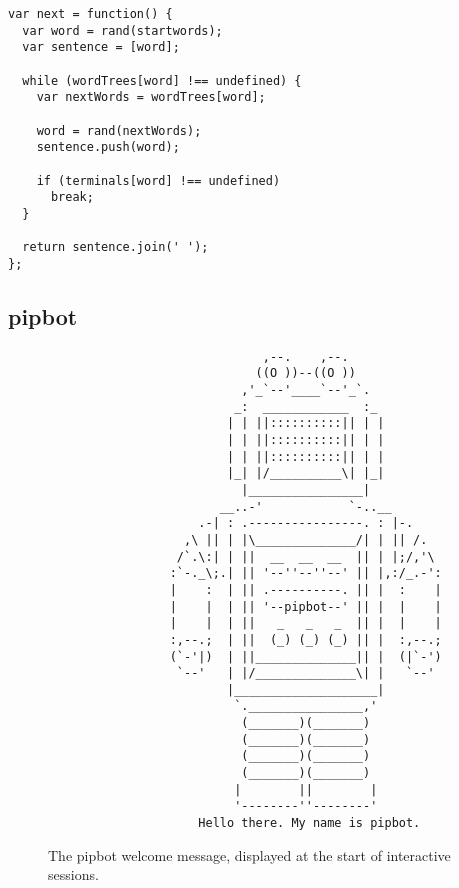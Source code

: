 \lstset{language=JavaScript}
\begin{lstlisting}[label=lst:build-javascript,caption={
      [Markov text generator]
      Markov text generator implementation.}]
var next = function() {
  var word = rand(startwords);
  var sentence = [word];

  while (wordTrees[word] !== undefined) {
    var nextWords = wordTrees[word];

    word = rand(nextWords);
    sentence.push(word);

    if (terminals[word] !== undefined)
      break;
  }

  return sentence.join(' ');
};
\end{lstlisting}


\newpage
\subsection{pipbot}\label{sec:pipbot}


\begin{figure}[H]
\begin{verbatim}
                              ,--.    ,--.
                             ((O ))--((O ))
                           ,'_`--'____`--'_`.
                          _:  ____________  :_
                         | | ||::::::::::|| | |
                         | | ||::::::::::|| | |
                         | | ||::::::::::|| | |
                         |_| |/__________\| |_|
                           |________________|
                        __..-'            `-..__
                     .-| : .----------------. : |-.
                   ,\ || | |\______________/| | || /.
                  /`.\:| | ||  __  __  __  || | |;/,'\
                 :`-._\;.| || '--''--''--' || |,:/_.-':
                 |    :  | || .----------. || |  :    |
                 |    |  | || '--pipbot--' || |  |    |
                 |    |  | ||   _   _   _  || |  |    |
                 :,--.;  | ||  (_) (_) (_) || |  :,--.;
                 (`-'|)  | ||______________|| |  (|`-')
                  `--'   | |/______________\| |   `--'
                         |____________________|
                          `.________________,'
                           (_______)(_______)
                           (_______)(_______)
                           (_______)(_______)
                           (_______)(_______)
                          |        ||        |
                          '--------''--------'
                     Hello there. My name is pipbot.
\end{verbatim}
\caption[The pipbot welcome message]
  {The pipbot welcome message, displayed at the start of interactive sessions.}
\label{fig:pipbot-logo}
\end{figure}



